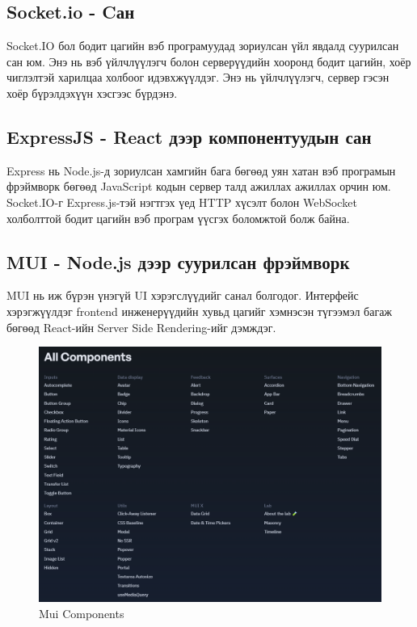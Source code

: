 \subsection{Socket.io - Cан}

Socket.IO бол бодит цагийн вэб програмуудад зориулсан үйл явдалд суурилсан сан юм. Энэ нь вэб үйлчлүүлэгч болон серверүүдийн хооронд бодит цагийн, хоёр чиглэлтэй харилцаа холбоог идэвхжүүлдэг. Энэ нь үйлчлүүлэгч, сервер гэсэн хоёр бүрэлдэхүүн хэсгээс бүрдэнэ.

\subsection{ExpressJS - React дээр компонентуудын сан}

Express нь Node.js-д зориулсан хамгийн бага бөгөөд уян хатан вэб програмын фрэймворк бөгөөд JavaScript кодын сервер талд ажиллах ажиллах орчин юм.
Socket.IO-г Express.js-тэй нэгтгэх үед HTTP хүсэлт болон WebSocket холболттой бодит цагийн вэб програм үүсгэх боломжтой болж байна.

\subsection{MUI - Node.js дээр суурилсан фрэймворк}

MUI нь иж бүрэн үнэгүй UI хэрэгслүүдийг санал болгодог.
Интерфейс хэрэгжүүлдэг frontend инженерүүдийн хувьд цагийг хэмнэсэн түгээмэл багаж бөгөөд React-ийн Server Side Rendering-ийг дэмждэг.

\begin{figure}[h]
	\centering
	\includegraphics[width=15cm]{images/MUI.png}
	\caption{Mui Components}
	\label{fig:prisma}
\end{figure}
